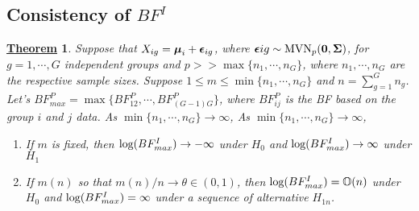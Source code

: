 \documentclass[12pt]{article}
\newtheorem{Th}{\underline{\bf Theorem}}
\def\bzero{{\mathbf 0}}
\def\log{\hbox{log}}
\def\MVN{\hbox{MVN}}
\def\log{\hbox{log}}
\def\bzero{{\mathbf 0}}
\newcommand{\uepsilon}          {\mbox{\boldmath$\epsilon$}}
\newcommand{\umu}               {\mbox{\boldmath$\mu$}}
\newcommand{\uSigma}            {\mbox{\boldmath$\Sigma$}}
\begin{document}
\subsection{Consistency of $BF^{I}$}
\begin{Th}
Suppose that $X_{ig} = \umu_i + \uepsilon_{ig}$, where $\uepsilon{ig} \sim \MVN_{p}(\bzero, \uSigma)$, for $g = 1, \cdots, G$ independent groups and $p >> \max\{n_1, \cdots, n_{G}\}$, where $n_1, \cdots, n_{G}$ are the respective sample sizes. Suppose $1 \leq m  \leq \min\{n_1, \cdots, n_{G}\}$ and $n = \sum^{G}_{g=1}n_g$. Let's $BF^{P}_{max} = \max\{BF^{P}_{12}, \cdots, BF^{P}_{(G-1)G}\}$, where $BF^{P}_{ij}$ is the BF based on the group $i$ and $j$ data. As $\min\{n_1, \cdots, n_{G}\} \rightarrow \infty$, As $\min\{n_1, \cdots, n_{G}\} \rightarrow \infty$,
\begin{enumerate}
    \item If $m$ is fixed, then $\log(BF^{I}_{max}) \rightarrow -\infty$ under $H_0$ and $\log(BF^{I}_{max}) \rightarrow \infty$ under $H_1$ 
    \item If $m(n)$ so that $m(n)/n \rightarrow \theta \in (0, 1)$, then $\log(BF^{I}_{max}) = \mathbb{O}(n)$ under $H_0$ and $\log(BF^{I}_{max}) = \infty$ under a sequence of alternative $H_{1n}$.
\end{enumerate}
\end{Th}
\end{document}
